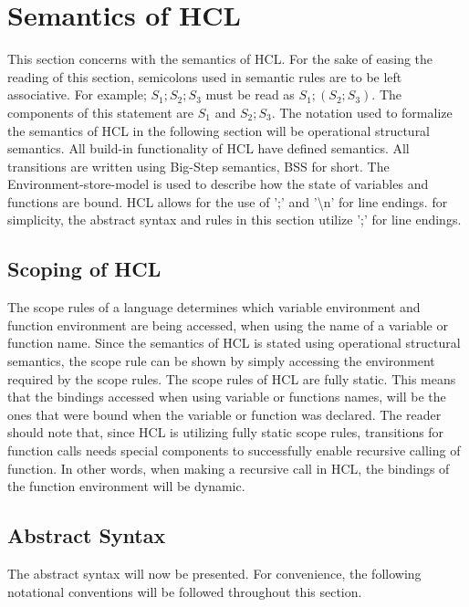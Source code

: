 \newpage
\section{Semantics of HCL}
This section concerns with the semantics of HCL.
For the sake of easing the reading of this section, semicolons used in semantic rules are to be left associative.
For example; $S_1;S_2;S_3$ must be read as $S_1;(S_2;S_3)$.
The components of this statement are $S_1$ and $S_2;S_3$.
The notation used to formalize the semantics of HCL in the following section will be operational structural semantics.
All build-in functionality of HCL have defined semantics.
All transitions are written using Big-Step semantics, BSS for short.
The Environment-store-model is used to describe how the state of variables and functions are bound.
HCL allows for the use of ';' and '{\textbackslash}n' for line endings.
for simplicity, the abstract syntax and rules in this section utilize ';' for line endings. 

\subsection{Scoping of HCL}
The scope rules of a language determines which variable environment and function environment are being accessed, when using the name of a variable or function name.
Since the semantics of HCL is stated using operational structural semantics, the scope rule can be shown by simply accessing the environment required by the scope rules.
The scope rules of HCL are fully static.
This means that the bindings accessed when using variable or functions names, will be the ones that were bound when the variable or function was declared.
The reader should note that, since HCL is utilizing fully static scope rules, transitions for function calls needs special components to successfully enable recursive calling of function.
In other words, when making a recursive call in HCL, the bindings of the function environment will be dynamic.

\subsection{Abstract Syntax}
The abstract syntax will now be presented.
For convenience, the following notational conventions will be followed throughout this section.

